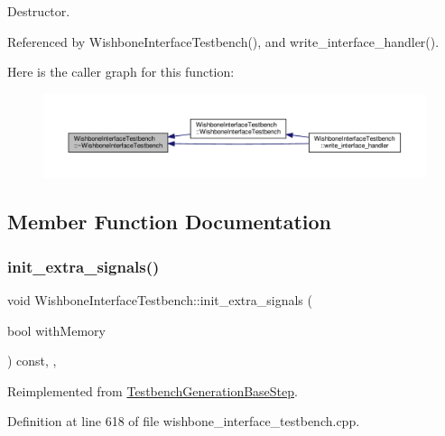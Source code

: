 Destructor. 



Referenced by Wishbone\+Interface\+Testbench(), and write\+\_\+interface\+\_\+handler().

Here is the caller graph for this function\+:
\nopagebreak
\begin{figure}[H]
\begin{center}
\leavevmode
\includegraphics[width=350pt]{de/ded/classWishboneInterfaceTestbench_ac5a3468a63abaf77f4c990558f2785ae_icgraph}
\end{center}
\end{figure}


\subsection{Member Function Documentation}
\mbox{\label{classWishboneInterfaceTestbench_ab6123ce32d28cf46681575d10c293158}} 
\subsubsection{\texorpdfstring{init\+\_\+extra\+\_\+signals()}{init\_extra\_signals()}}
{\footnotesize\ttfamily void Wishbone\+Interface\+Testbench\+::init\+\_\+extra\+\_\+signals (\begin{DoxyParamCaption}\item[{bool}]{with\+Memory }\end{DoxyParamCaption}) const\hspace{0.3cm}{\ttfamily [override]}, {\ttfamily [protected]}, {\ttfamily [virtual]}}



Reimplemented from \hyperlink{classTestbenchGenerationBaseStep_a8f0da7801c3e9c8050240d9567d70bc9}{Testbench\+Generation\+Base\+Step}.



Definition at line 618 of file wishbone\+\_\+interface\+\_\+testbench.\+cpp.



